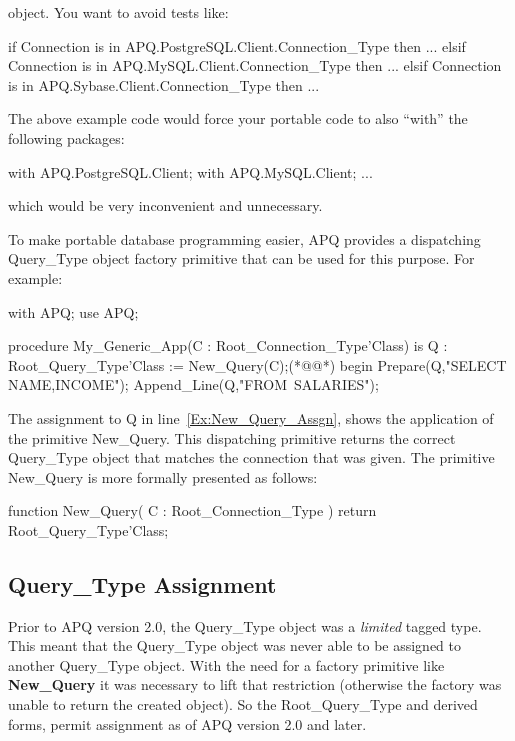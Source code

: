 \documentclass[english,letterpaper]{book}
\begin{document}
object. You want to avoid tests like:

\begin{Example}

if Connection is in APQ.PostgreSQL.Client.Connection_Type then
   ...
elsif Connection is in APQ.MySQL.Client.Connection_Type then
   ...
elsif Connection is in APQ.Sybase.Client.Connection_Type then
   ...

\end{Example}

The above example code would force your portable code to also ``with''
the following packages:

\begin{Example}
with APQ.PostgreSQL.Client;
with APQ.MySQL.Client;
...
\end{Example}

which would be very inconvenient and unnecessary.

To make portable database programming easier, APQ provides a dispatching
Query\_Type object factory primitive that can be used for this purpose.
For example:

\begin{NumberedExample}[caption={Big test}]
with APQ;
use APQ;

procedure My_Generic_App(C : Root_Connection_Type'Class) is
   Q : Root_Query_Type'Class := New_Query(C);(*@\label{Ex:New_Query_Assgn}@*)
begin
   Prepare(Q,"SELECT NAME,INCOME");
   Append_Line(Q,"FROM~SALARIES");
\end{NumberedExample}

The assignment to Q in line~\ref{Ex:New_Query_Assgn}, shows the
application of the primitive New\_Query. This dispatching
primitive returns the correct Query\_Type object that matches the
connection that was given. The primitive New\_Query is more formally
presented as follows:

\begin{Code}
function New_Query(
   C : Root_Connection_Type
) return Root_Query_Type'Class;
\end{Code}

\subsection{Query\_Type Assignment\label{Query_Type Cloning}}

Prior to APQ version 2.0, the Query\_Type object was a \emph{limited}
tagged type. This meant that the Query\_Type object was never able
to be assigned to another Query\_Type object. With the need for a
factory primitive like \textbf{New\_Query} it was necessary to lift
that restriction (otherwise the factory was unable to return the created
object). So the Root\_Query\_Type and derived forms, permit assignment
as of APQ version 2.0 and later.
\end{document}
